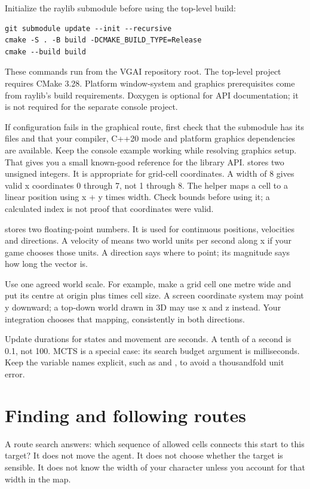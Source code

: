\documentclass[11pt,a4paper]{article}
\begin{document}
Initialize the raylib submodule before using the top-level build:\begin{lstlisting}
git submodule update --init --recursive
cmake -S . -B build -DCMAKE_BUILD_TYPE=Release
cmake --build build
\end{lstlisting}
These commands run from the VGAI repository root. The top-level project requires CMake 3.28. Platform window-system and graphics prerequisites come from raylib's build requirements. Doxygen is optional for API documentation; it is not required for the separate console project.

If configuration fails in the graphical route, first check that the submodule has its files and that your compiler, C++20 mode and platform graphics dependencies are available. Keep the console example working while resolving graphics setup. That gives you a small known-good reference for the library API.
 stores two unsigned integers. It is appropriate for grid-cell coordinates. A width of 8 gives valid x coordinates 0 through 7, not 1 through 8. The helper  maps a cell to a linear position using x + y times width. Check bounds before using it; a calculated index is not proof that coordinates were valid.

 stores two floating-point numbers. It is used for continuous positions, velocities and directions. A velocity of  means two world units per second along x if your game chooses those units. A direction says where to point; its magnitude says how long the vector is.

Use one agreed world scale. For example, make a grid cell one metre wide and put its centre at origin plus  times cell size. A screen coordinate system may point y downward; a top-down world drawn in 3D may use x and z instead. Your integration chooses that mapping, consistently in both directions.

Update durations for states and movement are seconds. A tenth of a second is 0.1, not 100. MCTS is a special case: its search budget argument is milliseconds. Keep the variable names explicit, such as  and , to avoid a thousandfold unit error.
\clearpage\part{Finding and following routes}
A route search answers: which sequence of allowed cells connects this start to this target? It does not move the agent. It does not choose whether the target is sensible. It does not know the width of your character unless you account for that width in the map.
\end{document}
